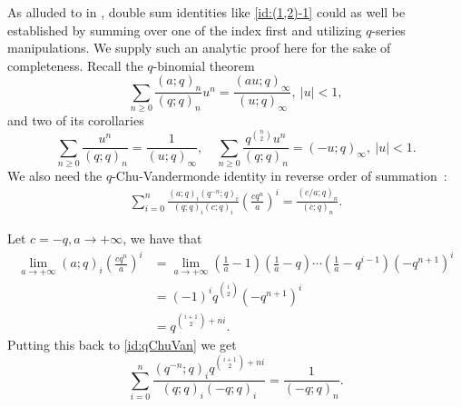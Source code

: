 \documentclass[11pt,reqno]{amsart}
\numberwithin{equation}{section}
\theoremstyle{plain}
\theoremstyle{definition}
\begin{document}
As alluded to in \cite{CW23}, double sum identities like \eqref{id:(1,2)-1} could as well be established by summing over one of the index first and utilizing $q$-series manipulations. We supply such an analytic proof here for the sake of completeness. Recall the $q$-binomial theorem~\cite[p.~354, (II.3)]{GR04}
$$
\sum\limits_{n\geq 0}\frac{(a; q)_{n}}{(q; q)_{n}}u^{n}=\frac{(au; q)_{\infty}}{(u; q)_{\infty}},\ |u|<1,
$$
and two of its corollaries
\begin{equation}
\sum\limits_{n\geq 0}\frac{u^n}{(q; q)_{n}}=\frac{1}{(u; q)_{\infty}},\quad \sum\limits_{n\geq 0}\frac{q^{\binom{n}{2}}u^n}{(q; q)_{n}}=(-u; q)_{\infty},\ |u|<1.\label{eq:bino cor}
\end{equation}
We also need the $q$-Chu-Vandermonde identity in reverse order of summation~\cite[p.~354, (II.7)]{GR04}:
\begin{align}\label{id:qChuVan}
\sum\limits_{i=0}^{n}\frac{(a; q)_{i}(q^{-n}; q)_{i}}{(q; q)_{i}(c; q)_{i}}\left(\frac{cq^{n}}{a}\right)^{i}=\frac{(c/a; q)_{n}}{(c; q)_{n}}.
\end{align}

Let $c=-q, a\rightarrow +\infty$, we have that
$$
\begin{aligned}
\lim\limits_{a\rightarrow +\infty}(a; q)_{i}\left(\frac{cq^{n}}{a}\right)^{i}&=\lim\limits_{a\rightarrow +\infty}(\frac{1}{a}-1)(\frac{1}{a}-q)\cdots(\frac{1}{a}-q^{i-1})(-q^{n+1})^{i}\\
&=(-1)^{i}q^{\binom{i}{2}}(-q^{n+1})^{i}\\
&=q^{\binom{i+1}{2}+ni}.
\end{aligned}
$$
Putting this back to \eqref{id:qChuVan} we get
\begin{equation}
\sum\limits_{i=0}^{n}\frac{(q^{-n}; q)_{i}q^{\binom{i+1}{2}+ni}}{(q; q)_{i}(-q; q)_{i}}=\frac{1}{(-q; q)_{n}}.\label{eq:new1}
\end{equation}
\end{document}
